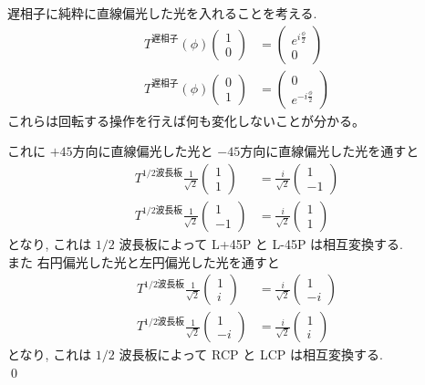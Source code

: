 \documentclass[uplatex,dvipdfmx,a4paper,11pt]{jlreq}
\makeatletter
\newcommand\mqty[1]{\begin{pmatrix}#1\end{pmatrix}}
\theoremstyle{definition}
\renewenvironment{proof}[1][\proofname]{\par
  \normalfont
  \topsep6\p@\@plus6\p@ \trivlist
  \item[\hskip\labelsep{\bfseries #1}\@addpunct{\bfseries}]\ignorespaces\quad\par
}{%
  \qed\endtrivlist\@endpefalse
}
\renewcommand\proofname{証明}
\makeatother
\begin{document}
\begin{proof}
  遅相子に純粋に直線偏光した光を入れることを考える.
  \begin{align}
    T^{\textrm{遅相子}}(\phi)\mqty{1 \\ 0} & = \mqty{e^{i\frac{\phi}{2}} \\ 0} \\
    T^{\textrm{遅相子}}(\phi)\mqty{0 \\ 1} & = \mqty{0 \\ e^{-i\frac{\phi}{2}}}
  \end{align}
  これらは回転する操作を行えば何も変化しないことが分かる。

  これに $+45$\textdegree 方向に直線偏光した光と $-45$\textdegree 方向に直線偏光した光を通すと
  \begin{align}
    T^{1/2\textrm{波長板}}\frac{1}{\sqrt{2}}\mqty{1 \\ 1} & = \frac{i}{\sqrt{2}}\mqty{1 \\ -1} \\
    T^{1/2\textrm{波長板}}\frac{1}{\sqrt{2}}\mqty{1 \\ -1} & = \frac{i}{\sqrt{2}}\mqty{1 \\ 1}
  \end{align}
  となり, これは $1/2$ 波長板によって L+45P と L-45P は相互変換する. \\

  また 右円偏光した光と左円偏光した光を通すと
  \begin{align}
    T^{1/2\textrm{波長板}}\frac{1}{\sqrt{2}}\mqty{1 \\ i} & = \frac{i}{\sqrt{2}}\mqty{1 \\ -i} \\
    T^{1/2\textrm{波長板}}\frac{1}{\sqrt{2}}\mqty{1 \\ -i} & = \frac{i}{\sqrt{2}}\mqty{1 \\ i}
  \end{align}
  となり, これは $1/2$ 波長板によって RCP と LCP は相互変換する. \\


\end{proof}
\end{document}
